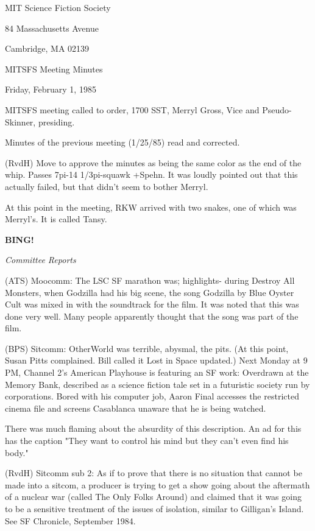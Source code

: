 \documentclass[12pt]{article}
\newcommand{\bing}{{\bf BING!} }
\newcommand{\goto}[1]{\bing \vskip 12pt \centerline{{\em{#1}}}}
\begin{document}
\begin{center}

MIT Science Fiction Society 

84 Massachusetts Avenue

Cambridge, MA 02139

\vspace{12pt}

MITSFS Meeting Minutes 

Friday, February 1, 1985

\end{center}
 
\vspace{18pt}

\setlength{\parskip}{6pt}

\noindent
MITSFS meeting called to order, 1700 SST,
Merryl Gross, Vice and Pseudo-Skinner, presiding.

Minutes of the previous meeting (1/25/85) read and corrected.

(RvdH) Move to approve the minutes as being the same color as the end of the whip. Passes 7pi-14 1/3pi-squawk +Spehn. It was loudly pointed out that this actually failed, but that didn't seem to bother Merryl.

At this point in the meeting, RKW arrived with two snakes, one of which was Merryl's. It is called Tansy.

\goto{Committee Reports}

(ATS) Moocomm: The LSC SF marathon was; highlights- during Destroy All Monsters, when Godzilla had his big scene, the song Godzilla by Blue Oyster Cult was mixed in with the soundtrack for the film. It was noted that this was done very well. Many people apparently thought that the song was part of the film.

(BPS) Sitcomm: OtherWorld was terrible, abysmal, the pits. (At this point, Susan Pitts complained. Bill called it Lost in Space updated.) Next Monday at 9 PM, Channel 2's American Playhouse is featuring an SF work: Overdrawn at the Memory Bank, described as a science fiction tale set in a futuristic society run by corporations. Bored with his computer job, Aaron Final accesses the restricted cinema file and screens Casablanca unaware that he is being watched.

There was much flaming about the absurdity of this description. An ad for this has the caption "They want to control his mind but they can't even find his body."

(RvdH) Sitcomm sub 2: As if to prove that there is no situation that cannot be made into a sitcom, a producer is trying to get a show going about the aftermath of a nuclear war (called The Only Folks Around) and claimed that it was going to be a sensitive treatment of the issues of isolation, similar to Gilligan's Island. See SF Chronicle, September 1984.
\end{document}
